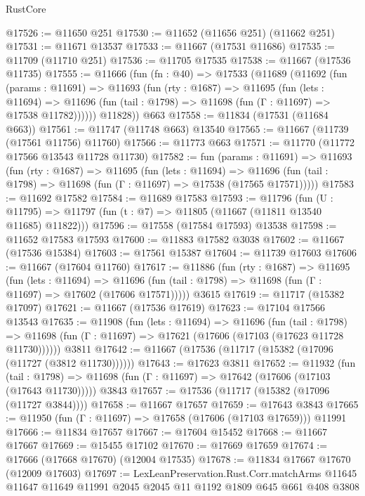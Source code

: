\begin{lexlean}{RustCore}
\begin{coremodule}
@17526 := @11650 @251
@17530 := @11652 (@11656 @251) (@11662 @251)
@17531 := @11671 @13537
@17533 := @11667 (@17531 @11686)
@17535 := @11709 (@11710 @251)
@17536 := @11705 @17535
@17538 := @11667 (@17536 @11735)
@17555 := @11666
    (fun (fn : @40) =>
    @17533
      (@11689
        (@11692
          (fun (params : @11691) =>
          @11693
            (fun (rty : @1687) =>
            @11695
              (fun (lets : @11694) =>
              @11696 (fun (tail : @1798) => @11698 (fun (Γ : @11697) => @17538 @11782))))))
        @11828))
    @663
@17558 := @11834 (@17531 (@11684 @663))
@17561 := @11747 (@11748 @663) @13540
@17565 := @11667 (@11739 (@17561 @11756) @11760)
@17566 := @11773 @663
@17571 := @11770 (@11772 @17566 @13543 @11728 @11730)
@17582 := fun (params : @11691) =>
  @11693
    (fun (rty : @1687) =>
    @11695
      (fun (lets : @11694) =>
      @11696 (fun (tail : @1798) => @11698 (fun (Γ : @11697) => @17538 (@17565 @17571)))))
@17583 := @11692 @17582
@17584 := @11689 @17583
@17593 := @11796
    (fun (U : @11795) => @11797 (fun (t : @7) => @11805 (@11667 (@11811 @13540 @11685) @11822)))
@17596 := @17558 (@17584 @17593) @13538
@17598 := @11652 @17583 @17593
@17600 := @11883 @17582 @3038
@17602 := @11667 (@17536 @15384)
@17603 := @17561 @15387
@17604 := @11739 @17603
@17606 := @11667 (@17604 @11760)
@17617 := @11886
    (fun (rty : @1687) =>
    @11695
      (fun (lets : @11694) =>
      @11696 (fun (tail : @1798) => @11698 (fun (Γ : @11697) => @17602 (@17606 @17571)))))
    @3615
@17619 := @11717 (@15382 @17097)
@17621 := @11667 (@17536 @17619)
@17623 := @17104 @17566 @13543
@17635 := @11908
    (fun (lets : @11694) =>
    @11696
      (fun (tail : @1798) =>
      @11698 (fun (Γ : @11697) => @17621 (@17606 (@17103 (@17623 @11728 @11730))))))
    @3811
@17642 := @11667 (@17536 (@11717 (@15382 (@17096 (@11727 (@3812 @11730))))))
@17643 := @17623 @3811
@17652 := @11932
    (fun (tail : @1798) => @11698 (fun (Γ : @11697) => @17642 (@17606 (@17103 (@17643 @11730)))))
    @3843
@17657 := @17536 (@11717 (@15382 (@17096 (@11727 @3844))))
@17658 := @11667 @17657
@17659 := @17643 @3843
@17665 := @11950 (fun (Γ : @11697) => @17658 (@17606 (@17103 @17659))) @11991
@17666 := @11834 @17657
@17667 := @17604 @15452
@17668 := @11667 @17667
@17669 := @15455 @17102
@17670 := @17669 @17659
@17674 := @17666 (@17668 @17670) (@12004 @17535)
@17678 := @11834 @17667 @17670 (@12009 @17603)
@17697 := LexLeanPreservation.Rust.Corr.matchArms
    @11645
    @11647
    @11649
    @11991
    @2045
    @2045
    @11
    @1192
    @1809
    @645
    @661
    @408
    @3808

\end{coremodule}
\end{lexlean}
